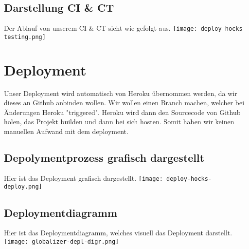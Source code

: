 	\subsection{Darstellung CI \& CT}
	Der Ablauf von unserem CI \& CT sieht wie gefolgt aus.\newline
	\noindent
	\texttt{[image: deploy-hocks-testing.png]}

	\section{Deployment}
	Unser Deployment wird automatisch von Heroku übernommen werden, da wir dieses an Github anbinden wollen. Wir wollen einen Branch machen, welcher bei Änderungen Heroku "triggered". Heroku wird dann den Sourcecode von Github holen, das Projekt builden und dann bei sich hosten. Somit haben wir keinen manuellen Aufwand mit dem deployment.

	\subsection{Depolymentprozess grafisch dargestellt}
	Hier ist das Deployment grafisch dargestellt.\newline
	\noindent
	\texttt{[image: deploy-hocks-deploy.png]}

	\subsection{Deploymentdiagramm}
	Hier ist das Deploymentdiagramm, welches visuell das Deployment darstellt.\newline
	\noindent
	\texttt{[image: globalizer-depl-digr.png]}

